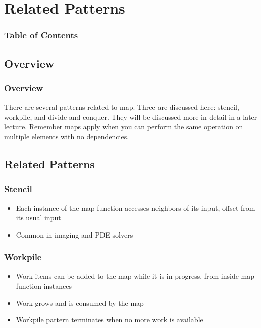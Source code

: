 \documentclass[xcolor=dvipsnames]{beamer}
\begin{document}
\section{Related Patterns} 

	\begin{frame} \frametitle{Table of Contents}
		\tableofcontents[currentsection]
	\end{frame} 
	
	\subsection*{Overview}
    \begin{frame} \frametitle{Overview}
        There are several patterns related to map. Three are discussed here:
        stencil, workpile, and divide-and-conquer. They will be discussed 
        more in detail in a later lecture. Remember maps apply when you can 
        perform the same operation on multiple elements with no dependencies.
    \end{frame}
	
	\subsection*{Related Patterns}
        \begin{frame} \frametitle{Stencil}
            \begin{itemize}
                \item Each instance of the map function accesses neighbors of 
                its input, offset from its usual input
                \item Common in imaging and PDE solvers
            \end{itemize}
        \end{frame}
        
		\begin{frame} \frametitle{Workpile}
			\begin{itemize}
				\item Work items can be added to the map while it is in 
                progress, from inside map function instances
				\item Work grows and is consumed by the map
				\item Workpile pattern terminates when no more work is
                available 
			\end{itemize}
	
		\end{frame}
		
\end{document}
